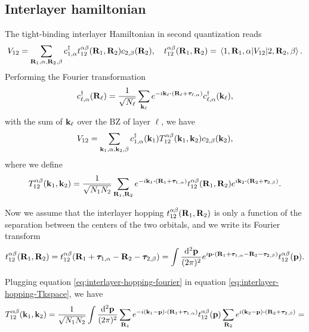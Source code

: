 \subsection{Interlayer hamiltonian}

The tight-binding interlayer Hamiltonian in second quantization reads
\begin{equation} \label{eq:interlayer-hopping}
V_{12} = \sum_{{\vb{R}}_1,\alpha,{\vb{R}}_2,\beta} c_{1,\alpha}^{\dagger} t_{12}^{\alpha\beta}({\vb{R}}_1,{\vb{R}}_2) c_{2,\beta}({\vb{R}}_2), \quad
t_{12}^{\alpha\beta}({\vb{R}}_1,{\vb{R}}_2) =
\mel{1,{\vb{R}}_1,\alpha}{V_{12}}{2,{\vb{R}}_2,\beta}.
\end{equation}
Performing the Fourier transformation
\begin{equation} \label{eq:blg-fourier}
c_{\ell,\alpha}^\d(\R_\ell) = \frac{1}{\sqrt{N_\ell}} \sum_{\k_\ell}
e^{-i\k_\ell \vdot (\R_\ell + \vtau_{\ell,\alpha})} c_{\ell,\alpha}^\d(\k_\ell),
\end{equation}
with the sum of ${\vb{k}}_\ell$ over the BZ of layer $\ell$, we have
\begin{equation} \label{eq:interlayer-hopping-kspace}
V_{12} = \sum_{{\vb{k}}_1,\alpha,{\vb{k}}_2,\beta} c_{1,\alpha}^{\dagger}({\vb{k}}_1) T_{12}^{\alpha\beta}({\vb{k}}_1,{\vb{k}}_2) c_{2,\beta}({\vb{k}}_2),
\end{equation}
where we define
\begin{equation} \label{eq:interlayer-hopping-Tkspace}
T_{12}^{\alpha\beta}(\k_1,\k_2) =
\frac{1}{\sqrt{N_1 N_2}} \sum_{\R_1,\R_2} e^{-i\k_1\vdot(\R_1+\vtau_{1,\alpha})}
t_{12}^{\alpha\beta}(\R_1,\R_2) e^{i\k_2\vdot(\R_2+\vtau_{2,\beta})}.
\end{equation}

Now we assume that the interlayer hopping $t_{12}^{\alpha\beta}({\vb{R}}_1,{\vb{R}}_2)$ is only a function of the separation between the centers of the two orbitals, and we write its Fourier transform
\begin{equation} \label{eq:interlayer-hopping-fourier}
t_{12}^{\alpha\beta}(\R_1,\R_2) = t_{12}^{\alpha\beta}(\R_1+\vtau_{1,\alpha}-\R_2-\vtau_{2,\beta}) =
\int \frac{\dd[2]{\p}}{(2\pi)^2} e^{i \p \vdot (\R_1+\vtau_{1,\alpha}-\R_2-\vtau_{2,\beta})} t_{12}^{\alpha\beta}(\p).
\end{equation}

Plugging equation \ref{eq:interlayer-hopping-fourier} in equation \ref{eq:interlayer-hopping-Tkspace}, we have
$$
T_{12}^{\alpha\beta}(\k_1,\k_2) = \frac{1}{\sqrt{N_1 N_2}} \int \frac{\dd[2]{\p}}{(2\pi)^2}
\sum_{\R_1} e^{-i(\k_1-\p)\vdot(\R_1+\vtau_{1,\alpha})} t_{12}^{\alpha\beta}(\p)
\sum_{\R_2} e^{i(\k_2-\p)\vdot(\R_2+\vtau_{2,\beta})} =
$$

